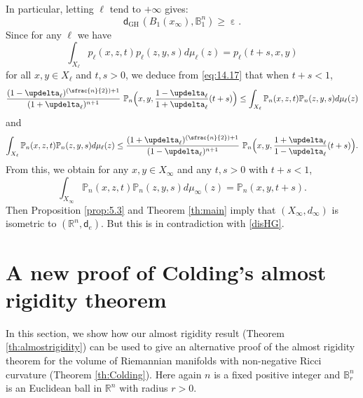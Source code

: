 \documentclass[JEP,XML,SOM,Unicode,published]{cedram}
\newcommand{\Psfrac}[2]{(\sfrac{#1}{#2})}
\newcommand{\sGH}{{\scriptscriptstyle\mathrm{GH}\,}}
\theoremstyle{plain}
\theoremstyle{definition}
\newcommand{\setR}{\mathbb{R}}
\newcommand{\bP}{\mathbb{P}}
\newcommand{\setB}{\mathbb{B}}
\newcommand{\dist}{\mathsf{d}}
\begin{document}
In particular, letting $\ell$ tend to $+\infty$ gives:
\begin{equation}\label{disHG}\dist_{\sGH}\left(B_1(x_\infty), \setB^n_1\right) \ge \upepsilon.\end{equation}
Since for any $\ell$ we have
\[
\int_{X_\ell}p_\ell(x,z,t)p_\ell(z,y,s)d\mu_\ell(z)=p_\ell(t+s,x,y)
\]
for all $x,y \in X_\ell$ and $t,s>0$, we deduce from \eqref{eq:14.17} that when $t+s<1$,
\[
\frac{(1-\updelta_\ell)^{\Psfrac n2+1}}{(1+\updelta_\ell)^{n+1}}\ \bP_n\Bigl(x,y,\frac{1-\updelta_\ell}{1+\updelta_\ell}(t+s)\Bigr)\le \int_{X_\ell}\bP_n(x,z,t)\bP_n(z,y,s)d\mu_\ell(z)
\]
and
\[
\int_{X_\ell}\bP_n(x,z,t)\bP_n(z,y,s)d\mu_\ell(z)\le \frac{(1+\updelta_\ell)^{\Psfrac n2+1}}{(1-\updelta_\ell)^{n+1}}\ \bP_n\Bigl(x,y,\frac{1+\updelta_\ell}{1-\updelta_\ell}(t+s)\Bigr).
\]
From this, we obtain for any $x,y\in X_\infty$ and any $t,s>0$ with $t+s<1$,
\[
\int_{X_\infty}\bP_n(x,z,t)\bP_n(z,y,s)d\mu_\infty(z)= \bP_n(x,y,t+s).
\]
Then Proposition \ref{prop:5.3} and Theorem \ref{th:main} imply that $(X_\infty,d_\infty)$ is isometric to $(\setR^n,\dist_e)$. But this is in contradiction with \eqref{disHG}.
\endproof

\section{A new proof of Colding's almost rigidity theorem}\label{sec:6}

In this section, we show how our almost rigidity result (Theorem \ref{th:almostrigidity}) can be used to give an alternative proof of the almost rigidity theorem for the volume of Riemannian manifolds with non-negative Ricci curvature (Theorem \ref{th:Colding}). Here again $n$ is a fixed positive integer and $\mathbb{B}_r^n$ is an Euclidean ball in $\setR^n$ with radius $r>0$.
\end{document}
